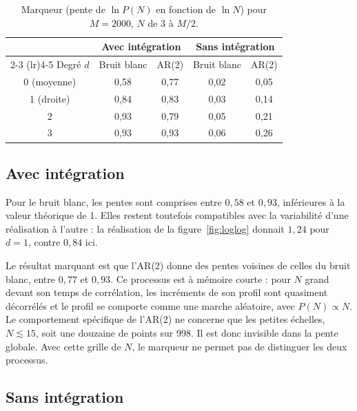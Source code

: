 \documentclass[11pt,a4paper]{article}
\begin{document}
\begin{table}[ht]
  \centering
  \begin{tabular}{ccccc}
    \toprule
    & \multicolumn{2}{c}{Avec intégration} & \multicolumn{2}{c}{Sans intégration} \\
    \cmidrule(lr){2-3} \cmidrule(lr){4-5}
    Degré $d$ & Bruit blanc & AR(2) & Bruit blanc & AR(2) \\
    \midrule
    0 (moyenne) & 0,58 & 0,77 & 0,02 & 0,05 \\
    1 (droite) & 0,84 & 0,83 & 0,03 & 0,14 \\
    2 & 0,93 & 0,79 & 0,05 & 0,21 \\
    3 & 0,93 & 0,93 & 0,06 & 0,26 \\
    \bottomrule
  \end{tabular}
  \caption{Marqueur (pente de $\ln P(N)$ en fonction de $\ln N$) pour $M = 2000$, $N$ de 3 à $M/2$.}
  \label{tab:pentes}
\end{table}

\subsection{Avec intégration}

Pour le bruit blanc, les pentes sont comprises entre $0{,}58$ et $0{,}93$, inférieures à la valeur théorique de 1. Elles restent toutefois compatibles avec la variabilité d'une réalisation à l'autre : la réalisation de la figure~\ref{fig:loglog} donnait $1{,}24$ pour $d = 1$, contre $0{,}84$ ici.

Le résultat marquant est que l'AR(2) donne des pentes voisines de celles du bruit blanc, entre $0{,}77$ et $0{,}93$. Ce processus est à mémoire courte : pour $N$ grand devant son temps de corrélation, les incréments de son profil sont quasiment décorrélés et le profil se comporte comme une marche aléatoire, avec $P(N) \propto N$. Le comportement spécifique de l'AR(2) ne concerne que les petites échelles, $N \lesssim 15$, soit une douzaine de points sur 998. Il est donc invisible dans la pente globale. Avec cette grille de $N$, le marqueur ne permet pas de distinguer les deux processus.

\subsection{Sans intégration}
\end{document}
